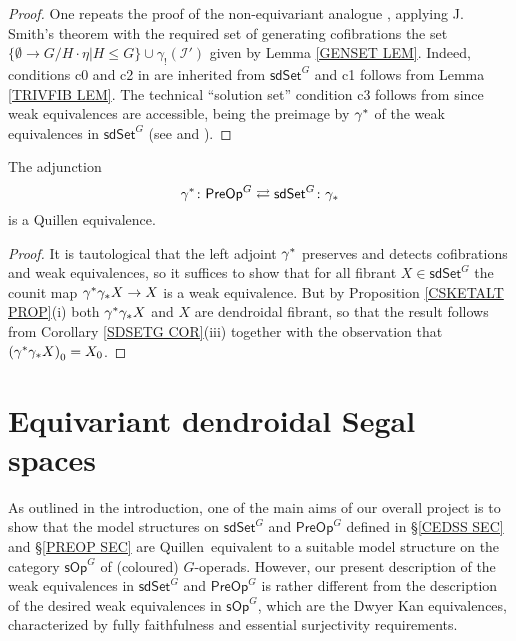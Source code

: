 \documentclass[a4paper,10pt
]{article}%
\begin{document}
\begin{proof}
One repeats the proof of the non-equivariant analogue \cite[Thm. 8.13]{CM13a}, applying J. Smith's theorem \cite[Thm. 1.7]{Bek00} with the required set of generating cofibrations the 
set $\{\emptyset \to G/H\cdot \eta | H \leq G\} \cup \gamma_! (\mathcal{I}')$ given by Lemma \ref{GENSET LEM}.
Indeed, conditions c0 and c2 in \cite{Bek00} are inherited from 
$\mathsf{sdSet}^G$ and c1 follows from Lemma \ref{TRIVFIB LEM}.
The technical ``solution set'' condition c3 follows from 
\cite[Prop. 1.15]{Bek00} since weak equivalences are accessible, being the preimage by $\gamma^{\**}$ of the weak equivalences in 
$\mathsf{sdSet}^G$ 
(see \cite[Cor. A.2.6.5]{Lur09} and \cite[Cor. A.2.6.6]{Lur09}). 
\end{proof}


\begin{theorem}\label{ANOQUEQUIV THM}
The adjunction
\[
	\gamma^{\**} \colon \mathsf{PreOp}^G	
\rightleftarrows
	\mathsf{sdSet}^G \colon \gamma_{\**}
\]
is a Quillen equivalence.
\end{theorem}

\begin{proof}
	It is tautological that the left adjoint $\gamma^{\**}$
	preserves and detects cofibrations and weak equivalences,
	so it suffices to show that for all fibrant
	$X \in \mathsf{sdSet}^G$
	the counit map 
	$\gamma^{\**} \gamma_{\**} X \to X$
	is a weak equivalence. 
	But by
	Proposition \ref{CSKETALT PROP}(i) both
	$\gamma^{\**} \gamma_{\**} X$ and $X$
	are dendroidal fibrant, 
	so that the result follows from 
	Corollary \ref{SDSETG COR}(iii) together with the observation that $\left(\gamma^{\**} \gamma_{\**} X\right)_0 = X_0$.
\end{proof}



\section{Equivariant dendroidal Segal spaces}
\label{EDSS_SEC}

As outlined in the introduction, one of the main aims of our overall project is to show that the model structures on 
$\mathsf{sdSet}^G$ and $\mathsf{PreOp}^G$
defined in \S \ref{CEDSS SEC} and \S \ref{PREOP SEC}
are Quillen\ equivalent to a suitable model structure on the category 
$\mathsf{sOp}^G$ of (coloured) $G$-operads.
However, our present description of the weak equivalences in 
$\mathsf{sdSet}^G$ and $\mathsf{PreOp}^G$
is rather different from the description of the desired weak equivalences in $\mathsf{sOp}^G$,
which are the Dwyer Kan equivalences, 
characterized by fully faithfulness and essential surjectivity requirements.
\end{document}
